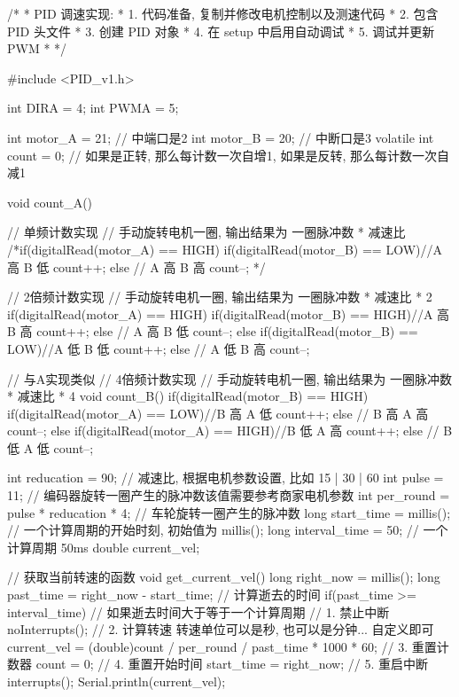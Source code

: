 \documentclass[openany, fontset=windowsold]{ctexbook}
\theoremstyle{kaiti}
\theoremstyle{normal}
\begin{document}
\begin{cpp}
  /*
   * PID 调速实现:
   * 1. 代码准备, 复制并修改电机控制以及测速代码
   * 2. 包含 PID 头文件
   * 3. 创建 PID 对象
   * 4. 在 setup 中启用自动调试
   * 5. 调试并更新 PWM
   * 
   */

  #include <PID_v1.h> 

  int DIRA = 4;
  int PWMA = 5;

  int motor_A = 21; // 中端口是2
  int motor_B = 20; // 中断口是3
  volatile int count = 0; // 如果是正转, 那么每计数一次自增1, 如果是反转, 那么每计数一次自减1 

  void count_A(){
    // 单频计数实现
    // 手动旋转电机一圈, 输出结果为 一圈脉冲数 * 减速比
    /*if(digitalRead(motor_A) == HIGH){
      if(digitalRead(motor_B) == LOW){//A 高 B 低
        count++;  
      } else { // A 高 B 高
        count--;  
      }
    }*/

    // 2倍频计数实现
    // 手动旋转电机一圈, 输出结果为 一圈脉冲数 * 减速比 * 2
    if(digitalRead(motor_A) == HIGH){
      if(digitalRead(motor_B) == HIGH){//A 高 B 高
        count++;  
      } else { // A 高 B 低
        count--;  
      }
    } else {
      if(digitalRead(motor_B) == LOW){//A 低 B 低
        count++;  
      } else { // A 低 B 高
        count--;  
      }  
    }
  }

  // 与A实现类似
  // 4倍频计数实现
  // 手动旋转电机一圈, 输出结果为 一圈脉冲数 * 减速比 * 4
  void count_B(){
    if(digitalRead(motor_B) == HIGH){
      if(digitalRead(motor_A) == LOW){//B 高 A 低
        count++;
      } else { // B 高 A 高
        count--;
      }
    } else {
      if(digitalRead(motor_A) == HIGH){//B 低 A 高
        count++;
      } else { // B 低 A 低
        count--;
      }
    }
  }

  int reducation = 90; // 减速比, 根据电机参数设置, 比如 15 | 30 | 60
  int pulse = 11; // 编码器旋转一圈产生的脉冲数该值需要参考商家电机参数
  int per_round = pulse * reducation * 4; // 车轮旋转一圈产生的脉冲数 
  long start_time = millis(); // 一个计算周期的开始时刻, 初始值为 millis();
  long interval_time = 50; // 一个计算周期 50ms
  double current_vel;

  // 获取当前转速的函数
  void get_current_vel(){
    long right_now = millis();  
    long past_time = right_now - start_time; // 计算逝去的时间
    if(past_time >= interval_time){ // 如果逝去时间大于等于一个计算周期
      // 1. 禁止中断
      noInterrupts();
      // 2. 计算转速 转速单位可以是秒, 也可以是分钟... 自定义即可
      current_vel = (double)count / per_round / past_time * 1000 * 60;
      // 3. 重置计数器
      count = 0;
      // 4. 重置开始时间
      start_time = right_now;
      // 5. 重启中断
      interrupts();
      Serial.println(current_vel);
    }
  }


\end{cpp}
\end{document}
